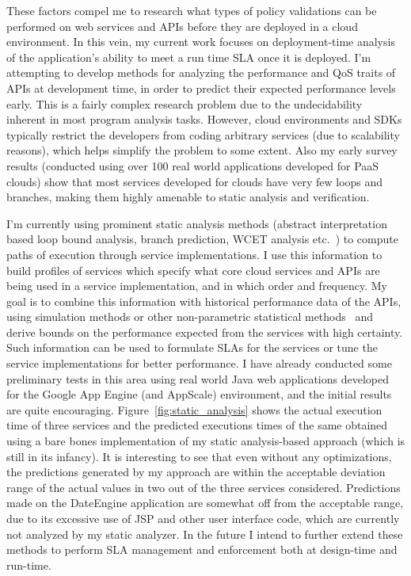 These factors compel me to research what types of policy validations can be 
performed
on web services and APIs before they are deployed in a cloud environment.
In this vein, my current work focuses on deployment-time analysis of 
the application's
ability to meet a run time SLA once it is deployed.  
I'm attempting to develop methods for analyzing the performance and
QoS traits of APIs at development time, in order to predict their expected performance 
levels early. This is a fairly complex research problem due to the undecidability
inherent in most program analysis tasks. However, cloud environments and SDKs
typically restrict the developers from coding arbitrary services (due to scalability reasons), 
which helps simplify the problem to some extent. Also my early survey results (conducted using
over 100 real world applications developed for PaaS clouds) show that most services developed for
clouds have very few loops and branches, making them highly amenable to static analysis and
verification.

I'm currently using
prominent static analysis methods (abstract interpretation based loop bound analysis,
branch prediction, WCET analysis etc.~\cite{ermedahl_et_al:OASIcs:2007:1194,Yeh:1991:TAT:123465.123475,bygde2010static}) 
to compute paths of execution through service 
implementations. I use this information to build profiles of services which
specify what core cloud services and APIs are being used in a service implementation,
and in which order and frequency. My goal is to combine this information with historical
performance data of the APIs, using simulation methods or other non-parametric statistical
methods~\cite{Nurmi:2007:QQB:1791551.1791556} and derive bounds on the performance expected from the services with high
certainty. 
Such information can be used to formulate SLAs for the services or tune
the service implementations for better performance. 
I have already conducted some preliminary tests in this area using real world
Java web applications developed for the Google App Engine (and AppScale) environment,
and the initial results are quite encouraging. Figure~\ref{fig:static_analysis} shows the actual
execution time of three services and the predicted executions times of the same obtained using
a bare bones implementation of my static analysis-based approach (which is still in its infancy). 
It is interesting
to see that even without any optimizations, the predictions generated by my approach are 
within the acceptable deviation range of the actual values in two out of the three services considered.
Predictions made on the DateEngine application are somewhat off from the acceptable range, due
to its excessive use of JSP and other user interface code, which are currently not analyzed by
my static analyzer.
In the future I intend to further extend 
these methods to perform SLA management and enforcement both at design-time and run-time.
